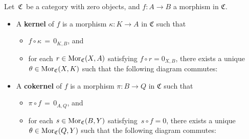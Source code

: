 \vskip 0.5cm
\begin{definition}
\mbox{}
\vskip 0.15cm
\noindent
Let \,$\mathfrak{C}$\, be a category with zero objects, and $f : A \longrightarrow B$ a morphism in $\mathfrak{C}$.
\begin{itemize}
\item
	A \textbf{kernel} of $f$ is a morphism $\kappa : K \longrightarrow A$ in $\mathfrak{C}$ such that
	\begin{itemize}
	\item
		\vskip -0.15cm
		$f \circ \kappa \,=\, 0_{K,B}$, and
	\item
		for each $r \in \textnormal{Mor}_{\mathfrak{C}}(X,A)$ satisfying $f \circ r = 0_{X,B}$,
		there exists a unique $\theta \in \textnormal{Mor}_{\mathfrak{C}}(X,K)$ such that the following diagram commutes:
		\begin{center}
		\end{center}
	\end{itemize}
\item
	A \textbf{cokernel} of $f$ is a morphism $\pi : B \longrightarrow Q$ in $\mathfrak{C}$ such that
	\begin{itemize}
	\item
		\vskip -0.15cm
		$\pi \circ f \,=\, 0_{A,Q}$, and
	\item
		for each $s \in \textnormal{Mor}_{\mathfrak{C}}(B,Y)$ satisfying \,$s \circ f = 0$,
		there exists a unique $\theta \in \textnormal{Mor}_{\mathfrak{C}}(Q,Y)$ such that the following diagram commutes:
		\begin{center}
		\end{center}
	\end{itemize}
\end{itemize}
\end{definition}


